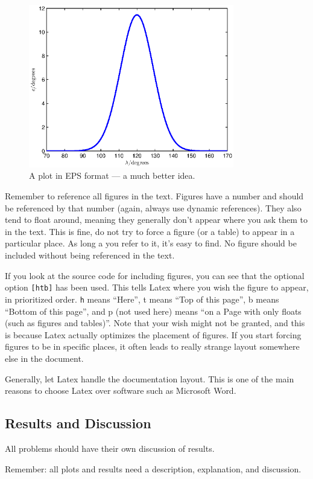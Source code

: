 \begin{figure}[htb]
	\centering
		\includegraphics[width=0.8\textwidth]{figures/constraint_eps.eps}
	\caption{A plot in EPS format --- a much better idea.}
\label{fig:constraint_eps}
\end{figure}

Remember to reference all figures in the text. Figures have a number and should be referenced by that number (again, always use dynamic references). They also tend to float around, meaning they generally don't appear where you ask them to in the text. This is fine, do not try to force a figure (or a table) to appear in a particular place. As long a you refer to it, it's easy to find. No figure should be included without being referenced in the text.

If you look at the source code for including figures, you can see that the optional option \verb+[htb]+ has been used. This tells Latex where you wish the figure to appear, in prioritized order. \verb+h+ means ``Here'', t means ``Top of this page'', b means ``Bottom of this page'', and p (not used here) means ``on a Page with only floats (such as figures and tables)''. Note that your wish might not be granted, and this is because Latex actually optimizes the placement of figures. If you start forcing figures to be in specific places, it often leads to really strange layout somewhere else in the document. 

Generally, let Latex handle the documentation layout. This is one of the main reasons to choose Latex over software such as Microsoft Word.

\subsection{Results and Discussion}
All problems should have their own discussion of results. 

Remember: all plots and results need a description, explanation, and discussion.
